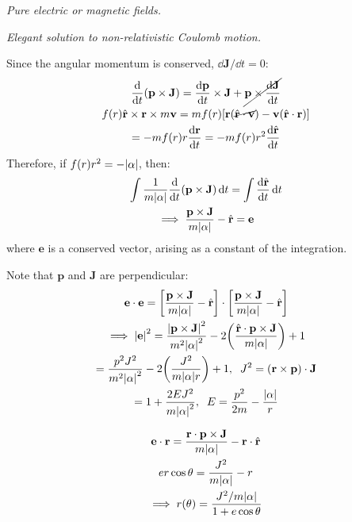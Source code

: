 \documentclass{report}
\begin{document}
\begin{subquests}
	\item \emph{Pure electric or magnetic fields.}

	\item \emph{Elegant solution to non-relativistic Coulomb motion.}
	\begin{subquests}
		\item
		Since the angular momentum is conserved, $\dd{\mathbf J}/\dd{t} = 0$:
		\begin{gather*}
			\dv{t}\pqty{\mathbf p \times \mathbf J} = \dv{\mathbf p}{t}\times \mathbf J + \cancel{\mathbf p \times \dv{\mathbf J}{t}} \\
			f(r)\hat{\mathbf r} \times \mathbf r \times m\mathbf v = mf(r)\bqty{\mathbf r\pqty{\cancel{\hat{\mathbf r}\cdot \mathbf v}} - \mathbf v\pqty{\hat{\mathbf r}\cdot \mathbf r}} \\
			= -mf(r)r\dv{\mathbf r}{t} = -mf(r)r^2 \dv{\hat{\mathbf r}}{t}  
		\end{gather*}
		Therefore, if $f(r)r^2 = -\abs{\alpha}$, then:
		\begin{gather*}
			\int \frac{1}{m\abs{\alpha}}\dv{t}\pqty{\mathbf p \times \mathbf J} \dd{t} = \int \dv{\hat{\mathbf r}}{t} \dd{t} \\
			\implies \frac{\mathbf p \times \mathbf J}{m\abs{\alpha}} - \hat{\mathbf r} = \mathbf e
		\end{gather*}
		where $\mathbf e$ is a conserved vector, arising as a constant of the integration. \\
		
		\item Note that $\mathbf p$ and $\mathbf J$ are perpendicular:
		\begin{gather*}
			\mathbf e \cdot \mathbf e = \bqty{\frac{\mathbf p \times \mathbf J}{m\abs{\alpha}} - \hat{\mathbf r}}\cdot \bqty{\frac{\mathbf p \times \mathbf J}{m\abs{\alpha}} - \hat{\mathbf r}} \\
			\implies \abs{\mathbf e}^2 = \frac{\abs{\mathbf p \times \mathbf J}^2}{m^2\abs{\alpha}^2} - 2\pqty{\frac{\hat{\mathbf r} \cdot \mathbf p \times \mathbf J}{m\abs{\alpha}}} + 1 \\
			= \frac{p^2 J^2}{m^2\abs{\alpha}^2}- 2\pqty{\frac{J^2}{m\abs{\alpha}r}} + 1,\;\;J^2 = \pqty{\mathbf r \times \mathbf p} \cdot \mathbf J\\
			= 1 + \frac{2EJ^2}{m\abs{\alpha}^2}, \;\; E = \frac{p^2}{2m} - \frac{\abs{\alpha}}{r}
		\end{gather*}
		
		\item
		\begin{gather*}
			\mathbf e \cdot \mathbf r = \frac{\mathbf r \cdot \mathbf p \times \mathbf J}{m\abs{\alpha}} - \mathbf r \cdot \hat{\mathbf r} \\
			er\cos\theta =  \frac{J^2}{m\abs{\alpha}} - r \\
			\implies r(\theta) = \frac{J^2/m\abs{\alpha}}{1+ e\cos\theta}
		\end{gather*}


\end{subquests}
\end{subquests}
\end{document}
